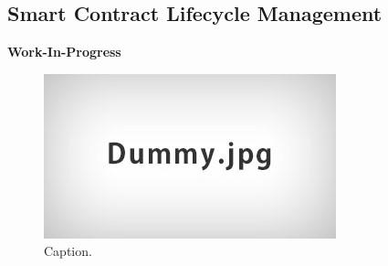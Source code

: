 \documentclass{llncs}
\makeatletter
\renewcommand\subsubsection{\@startsection{subsubsection}{3}{\z@}%
		{-18\p@ \@plus -4\p@ \@minus -4\p@}%
		{0.5em \@plus 0.22em \@minus 0.1em}%
		{\normalfont\normalsize\bfseries\boldmath}}
\makeatother
\begin{document}
{		%
			


			



		\subsection{Smart Contract Lifecycle Management}
			\label{ss:smart-contract-lifecycle-management}

			\textbf{Work-In-Progress}
			
			\begin{figure}[H]
				\centering
				\includegraphics[scale=0.4]{Figures/Dummy.jpg}
				\caption{Caption.}	
				\label{fig:smart-contract-lifecycle-management}
			\end{figure}			
			
}
\end{document}
